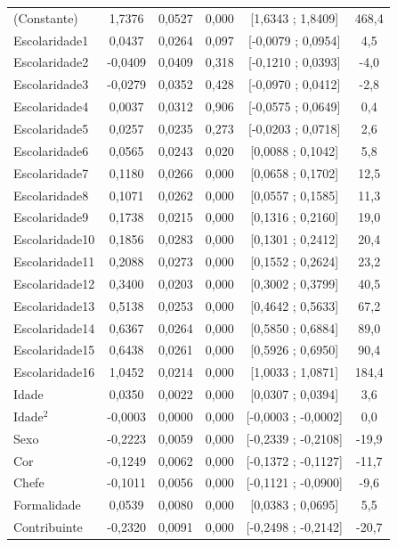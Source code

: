 \documentclass[12pt,a4paper,header]{abnt}
\begin{document}
\begin{center}
\begin{longtable}{lccccc}
(Constante) & 1,7376 & 0,0527 & 0,000 & [1,6343 ; 1,8409] & 468,4 \\
Escolaridade1 & 0,0437 & 0,0264 & 0,097 & [-0,0079 ; 0,0954] & 4,5 \\
Escolaridade2 & -0,0409 & 0,0409 & 0,318 & [-0,1210 ; 0,0393] & -4,0 \\
Escolaridade3 & -0,0279 & 0,0352 & 0,428 & [-0,0970 ; 0,0412] & -2,8 \\
Escolaridade4 & 0,0037 & 0,0312 & 0,906 & [-0,0575 ; 0,0649] & 0,4 \\
Escolaridade5 & 0,0257 & 0,0235 & 0,273 & [-0,0203 ; 0,0718] & 2,6 \\
Escolaridade6 & 0,0565 & 0,0243 & 0,020 & [0,0088 ; 0,1042] & 5,8 \\
Escolaridade7 & 0,1180 & 0,0266 & 0,000 & [0,0658 ; 0,1702] & 12,5 \\
Escolaridade8 & 0,1071 & 0,0262 & 0,000 & [0,0557 ; 0,1585] & 11,3 \\
Escolaridade9 & 0,1738 & 0,0215 & 0,000 & [0,1316 ; 0,2160] & 19,0 \\
Escolaridade10 & 0,1856 & 0,0283 & 0,000 & [0,1301 ; 0,2412] & 20,4 \\
Escolaridade11 & 0,2088 & 0,0273 & 0,000 & [0,1552 ; 0,2624] & 23,2 \\
Escolaridade12 & 0,3400 & 0,0203 & 0,000 & [0,3002 ; 0,3799] & 40,5 \\
Escolaridade13 & 0,5138 & 0,0253 & 0,000 & [0,4642 ; 0,5633] & 67,2 \\
Escolaridade14 & 0,6367 & 0,0264 & 0,000 & [0,5850 ; 0,6884] & 89,0 \\
Escolaridade15 & 0,6438 & 0,0261 & 0,000 & [0,5926 ; 0,6950] & 90,4 \\
Escolaridade16 & 1,0452 & 0,0214 & 0,000 & [1,0033 ; 1,0871] & 184,4 \\
Idade & 0,0350 & 0,0022 & 0,000 & [0,0307 ; 0,0394] & 3,6 \\
Idade$^2$ & -0,0003 & 0,0000 & 0,000 & [-0,0003 ; -0,0002] & 0,0 \\
Sexo & -0,2223 & 0,0059 & 0,000 & [-0,2339 ; -0,2108] & -19,9 \\
Cor & -0,1249 & 0,0062 & 0,000 & [-0,1372 ; -0,1127] & -11,7 \\
Chefe & -0,1011 & 0,0056 & 0,000 & [-0,1121 ; -0,0900] & -9,6 \\
Formalidade & 0,0539 & 0,0080 & 0,000 & [0,0383 ; 0,0695] & 5,5 \\
Contribuinte & -0,2320 & 0,0091 & 0,000 & [-0,2498 ; -0,2142] & -20,7 \\

\end{longtable}
\end{center}
\end{document}
